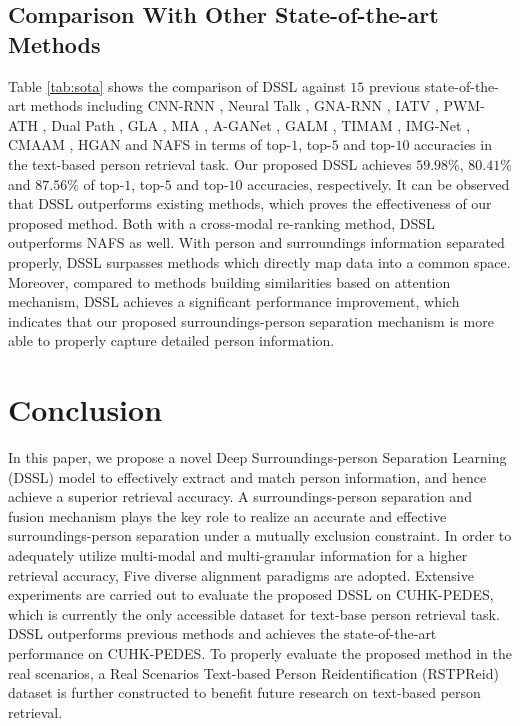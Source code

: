 \documentclass[sigconf]{acmart}
\begin{document}
\subsection{Comparison With Other State-of-the-art Methods}
Table \ref{tab:sota} shows the comparison of DSSL against $15$ previous state-of-the-art methods including CNN-RNN \cite{reed2016learning}, Neural Talk \cite{vinyals2015show}, GNA-RNN \cite{Shuang2017Person}, IATV \cite{li2017identity}, PWM-ATH \cite{Chen2018}, Dual Path \cite{zheng2020dual}, GLA \cite{chen2018improving}, MIA \cite{niu2020improving}, A-GANet \cite{mm2019graphreid}, GALM \cite{Jing2018Pose}, TIMAM \cite{ARL}, IMG-Net \cite{wang2020img}, CMAAM \cite{aggarwal2020text}, HGAN \cite{zheng2020hierarchical} and NAFS \cite{gao2021contextual} in terms of top-$1$, top-$5$ and top-$10$ accuracies in the text-based person retrieval task. Our proposed DSSL achieves $59.98\%$, $80.41\%$ and $87.56\%$ of top-$1$, top-$5$ and top-$10$ accuracies, respectively. It can be observed that DSSL outperforms existing methods, which proves the effectiveness of our proposed method. Both with a cross-modal re-ranking method, DSSL outperforms NAFS as well. With person and surroundings information separated properly, DSSL surpasses methods which directly map data into a common space. Moreover, compared to methods building similarities based on attention mechanism, DSSL achieves a significant performance improvement, which indicates that our proposed surroundings-person separation mechanism is more able to properly capture detailed person information.

\section{Conclusion}
In this paper, we propose a novel Deep Surroundings-person Separation Learning (DSSL) model to effectively extract and match person information, and hence achieve a superior retrieval accuracy.  A surroundings-person separation and fusion mechanism plays the key role to realize an accurate and effective surroundings-person separation under a mutually exclusion constraint. In order to adequately utilize multi-modal and multi-granular information for a higher retrieval accuracy, Five diverse alignment paradigms are adopted. Extensive experiments are carried out to evaluate the proposed DSSL on CUHK-PEDES, which is currently the only accessible dataset for text-base person retrieval task. DSSL outperforms previous methods and achieves the state-of-the-art performance on CUHK-PEDES. To properly evaluate the proposed method in the real scenarios, a Real Scenarios Text-based Person Reidentification (RSTPReid) dataset is further constructed to benefit future research on text-based person retrieval.



\vfill\eject 

\balance


\appendix
\end{document}
